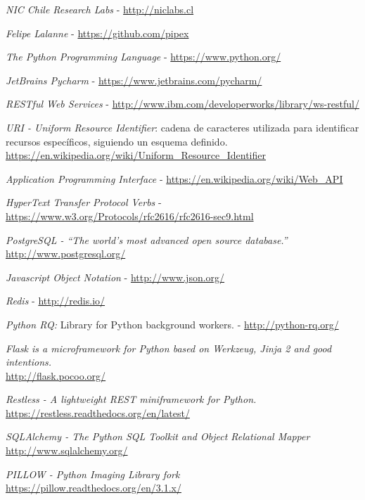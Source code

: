 \documentclass[11pt,letterpaper]{article}
\begin{document}
\begin{thebibliography}{5}
     \emph{NIC Chile Research Labs} - \url{http://niclabs.cl}

     \emph{Felipe Lalanne} - \url{https://github.com/pipex}

     \emph{The Python Programming Language} - \url{https://www.python.org/}

     \emph{JetBrains Pycharm} - \url{https://www.jetbrains.com/pycharm/}

     \emph{RESTful Web Services} - \url{http://www.ibm.com/developerworks/library/ws-restful/}

     \emph{URI - Uniform Resource Identifier}: cadena de caracteres utilizada para identificar recursos específicos, siguiendo un esquema definido.\\ \url{https://en.wikipedia.org/wiki/Uniform_Resource_Identifier}

     \emph{Application Programming Interface} - \url{https://en.wikipedia.org/wiki/Web_API}

     \emph{HyperText Transfer Protocol Verbs} - \url{https://www.w3.org/Protocols/rfc2616/rfc2616-sec9.html}

     \emph{PostgreSQL - ``The world's most advanced open source database.''}\\ \url{http://www.postgresql.org/}

     \emph{Javascript Object Notation} - \url{http://www.json.org/}

     \emph{Redis} - \url{http://redis.io/}

     \emph{Python RQ:} Library for Python background workers. - \url{http://python-rq.org/}

	 \emph{Flask is a microframework for Python based on Werkzeug, Jinja 2 and good intentions.}\\ \url{http://flask.pocoo.org/}

     \emph{Restless - A lightweight REST miniframework for Python.}\\ \url{https://restless.readthedocs.org/en/latest/}

    \emph{SQLAlchemy - The Python SQL Toolkit and Object Relational Mapper}\\ \url{http://www.sqlalchemy.org/}

    \emph{PILLOW - Python Imaging Library fork}\\ \url{https://pillow.readthedocs.org/en/3.1.x/}
\end{thebibliography}

\end{document}
